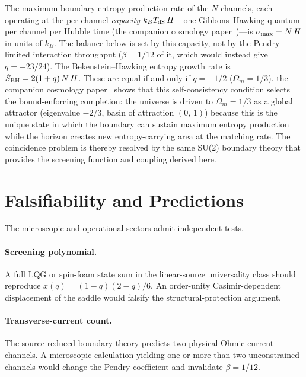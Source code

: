 \documentclass[aps,prd,twocolumn,10pt,superscriptaddress,nofootinbib]{revtex4-2}
\begin{document}
The maximum boundary entropy production rate of the $N$
channels, each operating at the per-channel \emph{capacity}
$k_B T_{\rm dS}\,H$---one Gibbons--Hawking quantum per channel
per Hubble time (the companion cosmology paper~\cite{Sayegh2026})---is
$\sigma_{\rm max} = N\,H$ in units of $k_B$.  The balance below is
set by this capacity, not by the Pendry-limited interaction
throughput ($\beta = 1/12$ of it, which would instead give
$q = -23/24$).  The
Bekenstein--Hawking entropy growth rate is
$\dot{S}_{\rm BH} = 2(1+q)\,N\,H$.  These are equal if and only
if $q = -1/2$ ($\Omega_m = 1/3$).
the companion cosmology paper~\cite{Sayegh2026} shows that this self-consistency
condition selects the bound-enforcing completion: the
universe is driven to $\Omega_m = 1/3$ as a global attractor
(eigenvalue $-2/3$, basin of attraction $(0,\,1)$) because this
is the unique state in which the boundary can sustain maximum
entropy production while the horizon creates new
entropy-carrying area at the matching rate.  The coincidence
problem is thereby resolved by the same SU(2) boundary theory
that provides the screening function and coupling derived here.




\section{Falsifiability and Predictions}
\label{sec:falsifiability}

The microscopic and operational sectors admit independent tests.

\paragraph{Screening polynomial.}
A full LQG or spin-foam state sum in the linear-source universality class
should reproduce
$x(q)=(1-q)(2-q)/6$.  An order-unity Casimir-dependent displacement of the
saddle would falsify the structural-protection argument.

\paragraph{Transverse-current count.}
The source-reduced boundary theory predicts two physical Ohmic current
channels.  A microscopic calculation yielding one or more than two
unconstrained channels would change the Pendry coefficient and invalidate
$\beta=1/12$.
\end{document}
